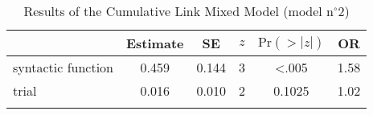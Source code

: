 \begin{table}
\begin{tabular}{l S[table-format=1.3] S[table-format=1.4] c S[table-format=<1.3] S[table-format=1.2]}
  \lsptoprule
 & {Estimate} & {SE} & {$z$} & {$\text{Pr}(>|z|)$} & {OR} \\ 
  \midrule
  syntactic function & 0.459 & 0.144 & 3 & <.005 & 1.58 \\ 
  trial              & 0.016 & 0.010 & 2 & 0.1025 & 1.02 \\ 
   \lspbottomrule
\end{tabular}
\caption{Results of the Cumulative Link Mixed Model (model n$^{\circ}$2)}
\label{tab:exp12-m2}
\end{table}
